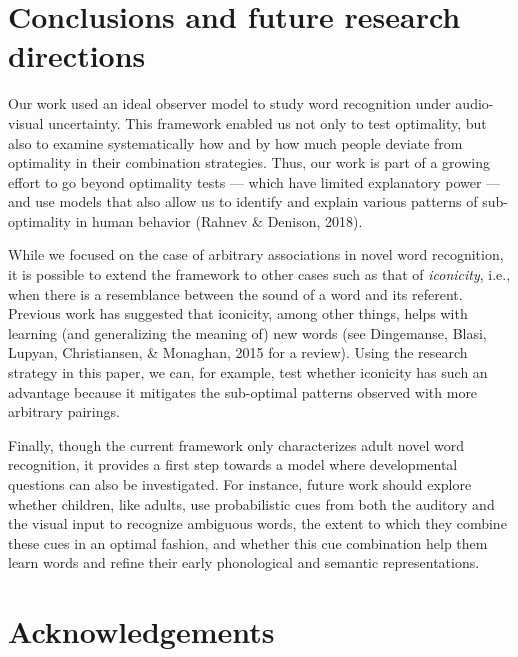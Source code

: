 \documentclass[english,,man,floatsintext]{apa6}
\theoremstyle{definition}
\theoremstyle{definition}
\theoremstyle{definition}
\theoremstyle{remark}
\begin{document}
\section{Conclusions and future research
directions}\label{conclusions-and-future-research-directions}

Our work used an ideal observer model to study word recognition under
audio-visual uncertainty. This framework enabled us not only to test
optimality, but also to examine systematically how and by how much
people deviate from optimality in their combination strategies. Thus,
our work is part of a growing effort to go beyond optimality tests ---
which have limited explanatory power --- and use models that also allow
us to identify and explain various patterns of sub-optimality in human
behavior (Rahnev \& Denison, 2018).

While we focused on the case of arbitrary associations in novel word
recognition, it is possible to extend the framework to other cases such
as that of \textit{iconicity}, i.e., when there is a resemblance between
the sound of a word and its referent. Previous work has suggested that
iconicity, among other things, helps with learning (and generalizing the
meaning of) new words (see Dingemanse, Blasi, Lupyan, Christiansen, \&
Monaghan, 2015 for a review). Using the research strategy in this paper,
we can, for example, test whether iconicity has such an advantage
because it mitigates the sub-optimal patterns observed with more
arbitrary pairings.

Finally, though the current framework only characterizes adult novel
word recognition, it provides a first step towards a model where
developmental questions can also be investigated. For instance, future
work should explore whether children, like adults, use probabilistic
cues from both the auditory and the visual input to recognize ambiguous
words, the extent to which they combine these cues in an optimal
fashion, and whether this cue combination help them learn words and
refine their early phonological and semantic representations.

\vspace{1em}

\vspace{1em}

\section{Acknowledgements}\label{acknowledgements}
\end{document}
